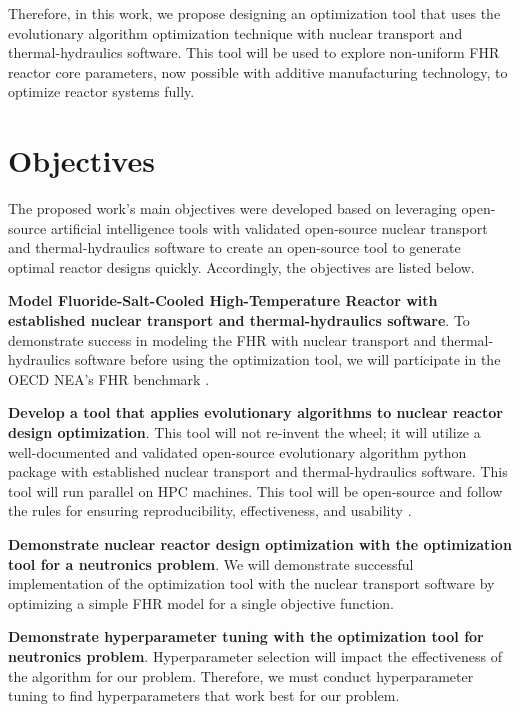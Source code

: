 Therefore, in this work, we propose designing an optimization tool that uses 
the evolutionary algorithm optimization technique with nuclear transport and 
thermal-hydraulics software. 
This tool will be used to explore non-uniform FHR reactor core parameters, now 
possible with additive manufacturing technology, to optimize reactor systems 
fully. 

\section{Objectives}
The proposed work's main objectives were developed based on leveraging 
open-source artificial intelligence tools with validated open-source nuclear 
transport and thermal-hydraulics software to create an open-source tool to 
generate optimal reactor designs quickly. 
Accordingly, the objectives are listed below. 

\vspace{0.2cm} 
\noindent
\textbf{Model Fluoride-Salt-Cooled High-Temperature Reactor with established 
nuclear transport and thermal-hydraulics software}.
To demonstrate success in modeling the \gls{FHR} with nuclear transport and 
thermal-hydraulics software before using the optimization tool, we will 
participate in the \gls{OECD} \gls{NEA}'s \gls{FHR} benchmark 
\cite{noauthor_fluoride_nodate}. 

\vspace{0.2cm} 
\noindent
\textbf{Develop a tool that applies evolutionary algorithms to nuclear 
reactor design optimization}. 
This tool will not re-invent the wheel; it will utilize a well-documented 
and validated open-source evolutionary algorithm python package with established 
nuclear transport and thermal-hydraulics software. This tool will run parallel on 
\gls{HPC} machines. This tool will be open-source and follow the rules for ensuring 
reproducibility, effectiveness, and usability 
\cite{list_ten_2017,osborne_ten_2014,sandve_ten_2013}. 

\vspace{0.2cm} 
\noindent
\textbf{Demonstrate nuclear reactor design optimization with the optimization tool 
for a neutronics problem}. 
We will demonstrate successful implementation of the optimization tool with the 
nuclear transport software by optimizing a simple \gls{FHR} model for a single 
objective function. 

\vspace{0.2cm} 
\noindent
\textbf{Demonstrate hyperparameter tuning with the optimization tool for neutronics problem}.
Hyperparameter selection will impact the effectiveness of the algorithm 
for our problem. 
Therefore, we must conduct hyperparameter tuning to find hyperparameters that work 
best for our problem. 

